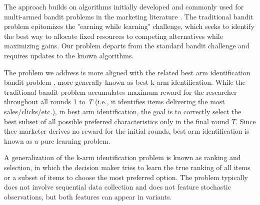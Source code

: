\documentclass[nonblindrev]{informs3}
\newcommand{\mismin}{\textbf{max-misclass}}
\newcommand{\ts}{\textbf{TS} }
\newcommand{\edts}{$\epsilon$-$\delta$-\textbf{diffuse TS} }
\newcommand{\edtsthres}{$\epsilon$-$\delta$-\textbf{TS-thres} }
\newcommand{\uncert}{\textbf{max-uncert} }
\begin{document}


The approach builds on algorithms initially developed and commonly used for multi-armed bandit problems in the marketing literature \citep{HauserEtAl2009,schwartzetal2017,Scott2010,urban2013morphing}. The traditional bandit problem epitomizes the "earning while learning" challenge, which seeks to identify the best way to allocate fixed resources to competing alternatives while maximizing gains. Our problem departs from the standard bandit challenge and requires updates to the known algorithms.

The problem we address is more aligned with the related best arm identification bandit problem \citep{russo2016simple}, more generally known as best k-arm identification. While the traditional bandit problem accumulates maximum reward for the researcher throughout all rounds 1 to \emph{T} (i.e., it identifies items delivering the most sales/clicks/etc.), in best arm identification, the goal is to correctly select the best subset of all possible preferred characteristics only in the final round $T$. Since thee marketer derives no reward for the initial rounds, best arm identification is known as a pure learning problem.

A generalization of the k-arm identification problem is known as ranking and selection, in which the decision maker tries to learn the true ranking of all items or a subset of items to choose the most preferred option. The problem typically does not involve sequential data collection and does not feature stochastic observations, but both features can appear in variants.
\end{document}
